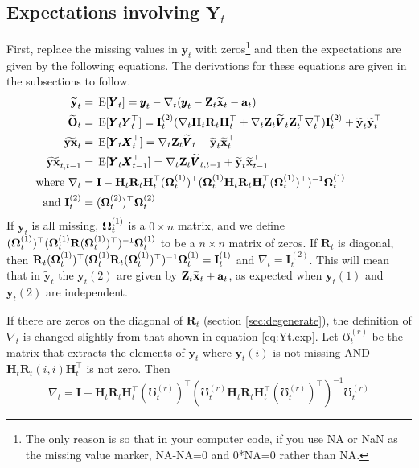 \documentclass[]{article}
\def\OMG{\mbox{\boldmath $\Omega$}}
\def\ZZ{\mbox{$\mathbf Z$}}	\def\zz{\mbox{$\mathbf z$}}
\def\HH{\mbox{$\mathbf H$}}	\def\hh{\mbox{$\mathbf h$}}
\def\II{\mbox{$\mathbf I$}} \def\ii{\mbox{$\mathbf i$}}
\def\IIm{\mbox{$\mathbf I$}}
\def\OO{\mbox{$\mathbf O$}}
\def\RR{\mbox{$\mathbf R$}}	 \def\rr{\mbox{$\mathbf r$}}
\def\VV{\mbox{$\pmb{V}$}}	\def\vv{\mbox{$\pmb{v}$}}
\def\XX{\mbox{$\pmb{X}$}}	\def\xx{\mbox{$\pmb{x}$}}
\def\YY{\mbox{$\pmb{Y}$}}	\def\yy{\mbox{$\pmb{y}$}}
\def\E{\,\textup{\textrm{E}}}
\def\hatxt{\widetilde{\mbox{$\mathbf x$}}_t}
\def\hatxtm{\widetilde{\mbox{$\mathbf x$}}_{t-1}}
\def\hatyt{\widetilde{\mbox{$\mathbf y$}}_t}
\def\hatOt{\widetilde{\OO}_t}
\def\hatYXt{\widetilde{\mbox{$\mathbf{y}\mathbf{x}$}}_t}
\def\hatYXttm{\widetilde{\mbox{$\mathbf{y}\mathbf{x}$}}_{t,t-1}}
\def\hatVt{\widetilde{\VV}_t}
\def\hatVttm{\widetilde{\VV}_{t,t-1}}
\def\IR{\nabla}
\begin{document}
\subsection{Expectations involving $\YY_t$}\label{sec:exp.Y}
First, replace the missing values in $\yy_t$ with zeros\footnote{The only reason is so that in your computer code, if you use NA or NaN as the missing value marker, NA-NA=0 and 0*NA=0 rather than NA.} and then the expectations are given by the following equations.  The derivations for these equations are given in the subsections to follow.
\begin{subequations}\label{eq:Yt.exp}
\begin{align}
\hatyt &= \E[\YY_t]=\yy_t-\IR_t(\yy_t-\ZZ_t\hatxt-\aa_t)\label{eq:hatyt}\\
\hatOt &= \E[\YY_t\YY_t^\top]=\IIm_t^{(2)}(\IR_t\HH_t\RR_t\HH_t^\top + \IR_t\ZZ_t\hatVt\ZZ_t^\top\IR_t^\top)\IIm_t^{(2)}  +  \hatyt\hatyt^\top \label{eq:hatOt}\\
\hatYXt&= \E[\YY_t\XX_t^\top] = \IR_t\ZZ_t\hatVt + \hatyt\hatxt^\top \label{eq:hatyxttm}\\
\hatYXttm&= \E[\YY_t\XX_{t-1}^\top] = \IR_t\ZZ_t\hatVttm + \hatyt\hatxtm^\top \label{eq:hatyxt}\\
\text{where }\IR_t &= \II-\HH_t\RR_t\HH_t^\top(\OMG_t^{(1)})^\top(\OMG_t^{(1)}\HH_t\RR_t\HH_t^\top(\OMG_t^{(1)})^\top)^{-1}\OMG_t^{(1)}\label{eq.IRt}\\
\text{and }\IIm_t^{(2)}&=(\OMG_t^{(2)})^\top\OMG_t^{(2)}
\label{eq:IRt}
\end{align}
\end{subequations}
If $\yy_t$ is all missing, $\OMG_t^{(1)}$ is a $0 \times n$ matrix, and we define $(\OMG_t^{(1)})^\top(\OMG_t^{(1)}\RR(\OMG_t^{(1)})^\top)^{-1}\OMG_t^{(1)}$ to be a $n \times n$ matrix of zeros.  If $\RR_t$ is diagonal, then $\RR_t(\OMG_t^{(1)})^\top(\OMG_t^{(1)}\RR_t(\OMG_t^{(1)})^\top)^{-1}\OMG_t^{(1)}=\IIm_t^{(1)}$ and $\IR_t=\IIm_t^{(2)}$.  This will mean that in $\hatyt$ the $\yy_t(2)$ are given by $\ZZ_t\hatxt+\aa_t$, as expected when $\yy_t(1)$ and $\yy_t(2)$ are independent.

If there are zeros on the diagonal of $\RR_t$ (section \ref{sec:degenerate}), the definition of $\IR_t$ is changed slightly from that shown in equation \ref{eq:Yt.exp}. Let $\mho_t^{(r)}$ be the matrix that extracts the elements of $\yy_t$ where $\yy_t(i)$ is not missing AND $\HH_t\RR_t(i,i)\HH_t^\top$ is not zero. Then
\begin{equation}
\IR_t = \II-\HH_t\RR_t\HH_t^\top(\mho_t^{(r)})^\top
(\mho_t^{(r)}\HH_t\RR_t\HH_t^\top(\mho_t^{(r)})^\top)^{-1}\mho_t^{(r)}
\label{eq:IRt.degen}
\end{equation}
\end{document}
